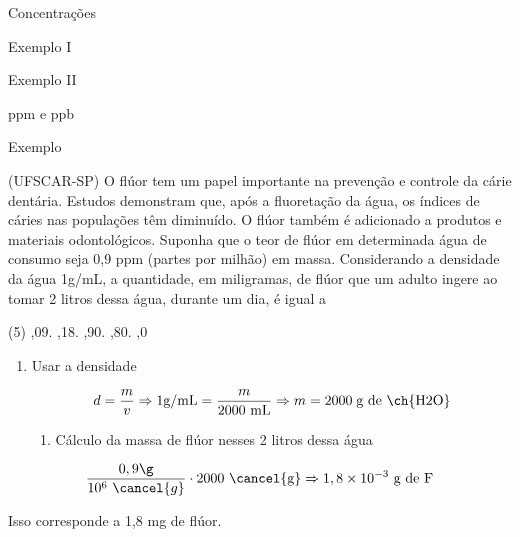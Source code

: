 \documentclass{beamer}
\begin{document}
\begin{frame}[label={sec:org8462e63}]{Concentrações}
\begin{block}{Exemplo I}
\end{block}




\begin{block}{Exemplo II}
\end{block}


\begin{block}{ppm e ppb}
\end{block}


\begin{block}{Exemplo}
\begin{question}
\alert{(UFSCAR-SP)} O flúor tem um papel importante na prevenção e controle da cárie dentária. Estudos demonstram que, após a fluoretação da água, os índices de cáries nas populações têm diminuído. O flúor também é adicionado a produtos e materiais odontológicos. Suponha que o teor de flúor em determinada água de consumo seja 0,9 ppm (partes por milhão) em massa. Considerando a densidade da água 1g/mL, a quantidade, em miligramas, de flúor que um adulto ingere ao tomar 2 litros dessa água, durante um dia, é igual a

\begin{choice}(5)
,09.
,18.
,90.
,80.
,0
\end{choice}
\end{question}

\begin{answer}[print=true]
\begin{enumerate}
\item Usar a densidade

\begin{align*}
d=\frac{m}{v} \Rightarrow 1 \text{g/mL}=\frac{m}{2000~\text{mL}} \Rightarrow  m = 2000 \; \text{g de \ch{H2O}}
\end{align*}

\begin{enumerate}
\item Cálculo da massa de flúor nesses 2 litros dessa água
\end{enumerate}
\end{enumerate}

\begin{align*}
\frac{0,9\g}{10^6~ \cancel{g}} \cdot 2000~\text{\cancel{g}} \Rightarrow 1,8 \times 10^{-3}~\text{g de F} 
\end{align*}

Isso corresponde a 1,8 mg de  flúor.
\end{answer}
\end{block}



\end{frame}
\end{document}
